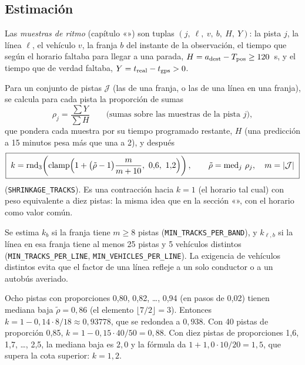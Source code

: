 \subsection{Estimación}

Las \emph{muestras de ritmo} (capítulo «») son tuplas $(j,\ \ell,\ v,\ b,\ H,\ Y)$: la pista $j$,
la línea $\ell$, el vehículo $v$, la franja $b$ del instante de la observación, el tiempo que según el horario faltaba
para llegar a una parada, $H=a_{\mathrm{dest}}-T_{\mathrm{pos}}\ge120$~s, y el tiempo que de verdad faltaba, $Y=t_{\mathrm{real}}-t_{\mathrm{gps}}>0$.

Para un conjunto de pistas $\mathcal J$ (las de una franja, o las de una línea en una franja), se calcula para cada
pista la proporción de sumas
\begin{equation}
\rho_j=\frac{\sum Y}{\sum H}\qquad\text{(sumas sobre las muestras de la pista $j$)},
\end{equation}
que pondera cada muestra por su tiempo programado restante, $H$ (una predicción a 15 minutos pesa más que una a 2),
y después
\begin{equation}
\label{eq:k-contraido}
\boxed{\;k=\redondeo_3\!\left(\clamp\!\Big(1+\big(\tilde\rho-1\big)\frac{m}{m+10},\ 0{,}6,\ 1{,}2\Big)\right),\qquad
\tilde\rho=\mediana_j\,\rho_j,\quad m=|\mathcal J|\;}
\end{equation}
(\texttt{SHRINKAGE\_TRACKS}). Es una contracción hacia $k=1$ (el horario tal cual) con peso equivalente a diez pistas:
la misma idea que en la sección «», con el horario como valor común.

Se estima $k_b$ si la franja tiene $m\ge8$ pistas (\texttt{MIN\_TRACKS\_PER\_BAND}), y $k_{\ell,b}$ si la
línea en esa franja tiene al menos 25 pistas y 5 vehículos distintos (\texttt{MIN\_TRACKS\_PER\_LINE},
\texttt{MIN\_VEHICLES\_PER\_LINE}). La exigencia de vehículos distintos evita que el factor de una línea refleje a un
solo conductor o a un autobús averiado.

\begin{ejemplo}
Ocho pistas con proporciones 0,80, 0,82, \dots, 0,94 (en pasos de 0,02) tienen mediana baja $\tilde\rho=0{,}86$ (el
elemento $\lfloor 7/2\rfloor=3$). Entonces $k=1-0{,}14\cdot8/18\approx0{,}93778$, que se redondea a $0{,}938$.
Con 40 pistas de proporción 0,85, $k=1-0{,}15\cdot40/50=0{,}88$. Con diez pistas de proporciones 1,6, 1,7, \dots, 2,5,
la mediana baja es $2{,}0$ y la fórmula da $1+1{,}0\cdot10/20=1{,}5$, que supera la cota superior: $k=1{,}2$.
\end{ejemplo}

